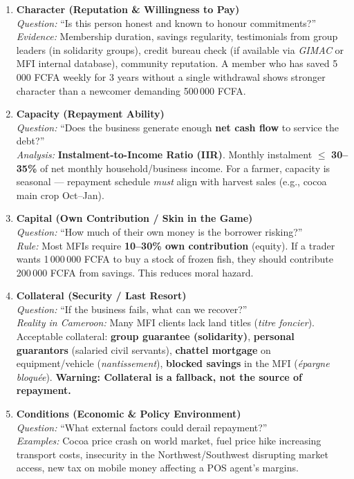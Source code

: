 \documentclass[11pt]{article}
\begin{document}
\begin{methode}
\begin{enumerate}
    \item \textbf{Character (Reputation \& Willingness to Pay)} \\
          \textit{Question:} ``Is this person honest and known to honour commitments?'' \\
          \textit{Evidence:} Membership duration, savings regularity, testimonials from group leaders (in solidarity groups), credit bureau check (if available via \emph{GIMAC} or MFI internal database), community reputation. A member who has saved 5\,000 FCFA weekly for 3 years without a single withdrawal shows stronger character than a newcomer demanding 500\,000 FCFA.
    \item \textbf{Capacity (Repayment Ability)} \\
          \textit{Question:} ``Does the business generate enough \textbf{net cash flow} to service the debt?'' \\
          \textit{Analysis:} \textbf{Instalment-to-Income Ratio (IIR)}. Monthly instalment $\le$ \textbf{30--35\%} of net monthly household/business income. For a farmer, capacity is seasonal — repayment schedule \emph{must} align with harvest sales (e.g., cocoa main crop Oct--Jan).
    \item \textbf{Capital (Own Contribution / Skin in the Game)} \\
          \textit{Question:} ``How much of their own money is the borrower risking?'' \\
          \textit{Rule:} Most MFIs require \textbf{10--30\% own contribution} (equity). If a trader wants 1\,000\,000 FCFA to buy a stock of frozen fish, they should contribute 200\,000 FCFA from savings. This reduces moral hazard.
    \item \textbf{Collateral (Security / Last Resort)} \\
          \textit{Question:} ``If the business fails, what can we recover?'' \\
          \textit{Reality in Cameroon:} Many MFI clients lack land titles (\emph{titre foncier}). Acceptable collateral: \textbf{group guarantee (solidarity)}, \textbf{personal guarantors} (salaried civil servants), \textbf{chattel mortgage} on equipment/vehicle (\emph{nantissement}), \textbf{blocked savings} in the MFI (\emph{épargne bloquée}). \textbf{Warning: Collateral is a fallback, not the source of repayment.}
    \item \textbf{Conditions (Economic \& Policy Environment)} \\
          \textit{Question:} ``What external factors could derail repayment?'' \\
          \textit{Examples:} Cocoa price crash on world market, fuel price hike increasing transport costs, insecurity in the Northwest/Southwest disrupting market access, new tax on mobile money affecting a POS agent's margins.
\end{enumerate}
\end{methode}
\end{document}
